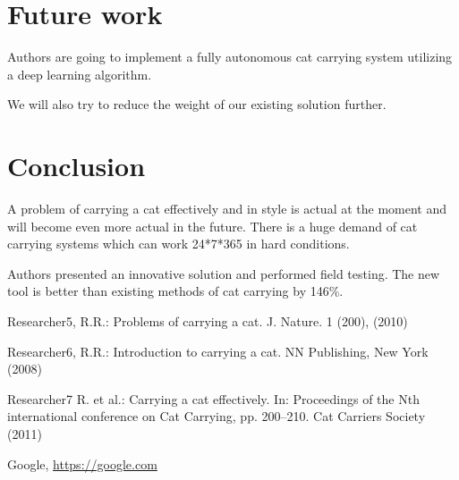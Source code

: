 \documentclass[runningheads,a4paper]{llncs}
\begin{document}
\section{Future work}

Authors are going to implement a fully autonomous cat carrying system utilizing
a deep learning algorithm.

We will also try to reduce the weight of our existing solution further. 

\section{Conclusion}

A problem of carrying a cat effectively and in style is actual
at the moment and will become even more actual in the future. There is a huge
demand of cat carrying systems which can work 24*7*365 in hard conditions.

Authors presented an innovative solution and performed field testing. The new
tool is better than existing methods of cat carrying by 146\%.

\begin{thebibliography}{4}

 Researcher5, R.R.: Problems of carrying a cat. J. Nature. 1 (200), (2010)

 Researcher6, R.R.: Introduction to carrying a cat. NN
  Publishing, New York (2008)

 Researcher7 R. et al.: Carrying a cat
  effectively. In: Proceedings of the Nth international
  conference on Cat Carrying, pp. 200--210. Cat Carriers Society (2011)

 Google, \url{https://google.com}

\end{thebibliography}
\end{document}
